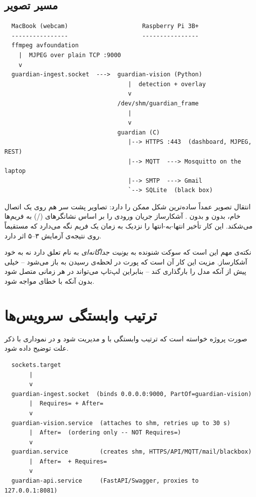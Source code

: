 \subsection{مسیر تصویر}

\begin{latin}
\begin{verbatim}
  MacBook (webcam)                     Raspberry Pi 3B+
  ----------------                     ----------------
  ffmpeg avfoundation
    |  MJPEG over plain TCP :9000
    v
  guardian-ingest.socket  --->  guardian-vision (Python)
                                   |  detection + overlay
                                   v
                                /dev/shm/guardian_frame
                                   |
                                   v
                                guardian (C)
                                   |--> HTTPS :443  (dashboard, MJPEG, REST)
                                   |--> MQTT  ---> Mosquitto on the laptop
                                   |--> SMTP  ---> Gmail
                                   `--> SQLite  (black box)
\end{verbatim}
\end{latin}

انتقال تصویر عمداً ساده‌ترین شکل ممکن را دارد: تصاویر  پشت سر هم روی یک اتصال  خام، بدون  و بدون . آشکارساز جریان ورودی را بر اساس نشانگرهای  (/) به فریم‌ها می‌شکند. این کار تأخیر انتها-به-انتها را نزدیک به زمان یک فریم نگه می‌دارد که مستقیماً روی نتیجه‌ی آزمایش ۳--۵ اثر دارد.

نکته‌ی مهم این است که سوکت شنونده به \emph{یونیت جداگانه‌ای} به نام  تعلق دارد نه به خود آشکارساز. مزیت این کار آن است که پورت در لحظه‌ی رسیدن به  باز می‌شود -- خیلی پیش از آنکه  مدل را بارگذاری کند -- بنابراین لپ‌تاپ می‌تواند در هر زمانی متصل شود بدون آنکه با خطای  مواجه شود.

\section{ترتیب وابستگی سرویس‌ها}

صورت پروژه خواسته است که ترتیب وابستگی با  و  مدیریت شود و در نموداری با ذکر علت توضیح داده شود.

\begin{latin}
\begin{verbatim}
  sockets.target
       |
       v
  guardian-ingest.socket  (binds 0.0.0.0:9000, PartOf=guardian-vision)
       |  Requires= + After=
       v
  guardian-vision.service  (attaches to shm, retries up to 30 s)
       |  After=  (ordering only -- NOT Requires=)
       v
  guardian.service         (creates shm, HTTPS/API/MQTT/mail/blackbox)
       |  After=  + Requires=
       v
  guardian-api.service     (FastAPI/Swagger, proxies to 127.0.0.1:8081)
\end{verbatim}
\end{latin}

